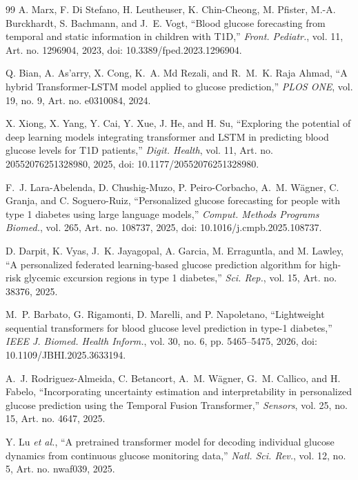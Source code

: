 \documentclass[journal]{IEEEtran}
\begin{document}
\begin{thebibliography}{99}
\label{ref20label} A. Marx, F. Di Stefano, H. Leutheuser, K. Chin-Cheong, M. Pfister, M.-A. Burckhardt, S. Bachmann, and J.~E. Vogt, ``Blood glucose forecasting from temporal and static information in children with T1D,'' \emph{Front. Pediatr.}, vol. 11, Art. no. 1296904, 2023, doi: 10.3389/fped.2023.1296904.

\label{ref21label} Q. Bian, A. As'arry, X. Cong, K.~A. Md Rezali, and R.~M.~K. Raja Ahmad, ``A hybrid Transformer-LSTM model applied to glucose prediction,'' \emph{PLOS ONE}, vol. 19, no. 9, Art. no. e0310084, 2024.

\label{ref22label} X. Xiong, X. Yang, Y. Cai, Y. Xue, J. He, and H. Su, ``Exploring the potential of deep learning models integrating transformer and LSTM in predicting blood glucose levels for T1D patients,'' \emph{Digit. Health}, vol. 11, Art. no. 20552076251328980, 2025, doi: 10.1177/20552076251328980.

\label{ref23label} F.~J. Lara-Abelenda, D. Chushig-Muzo, P. Peiro-Corbacho, A.~M. W\"agner, C. Granja, and C. Soguero-Ruiz, ``Personalized glucose forecasting for people with type 1 diabetes using large language models,'' \emph{Comput. Methods Programs Biomed.}, vol. 265, Art. no. 108737, 2025, doi: 10.1016/j.cmpb.2025.108737.

\label{ref24label} D. Darpit, K. Vyas, J.~K. Jayagopal, A. Garcia, M. Erraguntla, and M. Lawley, ``A personalized federated learning-based glucose prediction algorithm for high-risk glycemic excursion regions in type 1 diabetes,'' \emph{Sci. Rep.}, vol. 15, Art. no. 38376, 2025.

\label{ref25label} M.~P. Barbato, G. Rigamonti, D. Marelli, and P. Napoletano, ``Lightweight sequential transformers for blood glucose level prediction in type-1 diabetes,'' \emph{IEEE J. Biomed. Health Inform.}, vol. 30, no. 6, pp. 5465--5475, 2026, doi: 10.1109/JBHI.2025.3633194.

\label{ref26label} A.~J. Rodriguez-Almeida, C. Betancort, A.~M. W\"agner, G.~M. Callico, and H. Fabelo, ``Incorporating uncertainty estimation and interpretability in personalized glucose prediction using the Temporal Fusion Transformer,'' \emph{Sensors}, vol. 25, no. 15, Art. no. 4647, 2025.

\label{ref27label} Y. Lu \emph{et al.}, ``A pretrained transformer model for decoding individual glucose dynamics from continuous glucose monitoring data,'' \emph{Natl. Sci. Rev.}, vol. 12, no. 5, Art. no. nwaf039, 2025.


\end{thebibliography}
\end{document}
